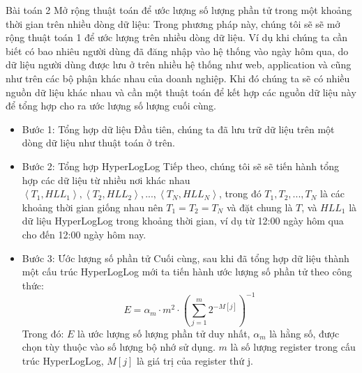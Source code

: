 \documentclass[10pt]{beamer}
\begin{document}
\begin{frame}[fragile]{Bài toán 2}
  Mở rộng thuật toán để ước lượng số lượng phần tử trong một khoảng thời gian trên nhiều dòng dữ liệu:
  Trong phương pháp này, chúng tôi sẽ sẽ mở rộng thuật toán 1 để ước lượng trên nhiều dòng dữ liệu. Ví dụ khi chúng ta cần biết có bao nhiêu người dùng
  đã đăng nhập vào hệ thống vào ngày hôm qua, do dữ liệu người dùng được lưu ở trên nhiều hệ thống như web, application và cũng như trên các bộ phận khác nhau
  của doanh nghiệp. Khi đó chúng ta sẽ có nhiều nguồn dữ liệu khác nhau và cần một thuật toán để kết hợp các nguồn dữ liệu này để tổng hợp cho ra ước lượng
  số lượng cuối cùng.
  \begin{itemize}
      \item Bước 1: Tổng hợp dữ liệu
      Đầu tiên, chúng ta đã lưu trữ dữ liệu trên một dòng dữ liệu như thuật toán ở trên. 
      \item Bước 2: Tổng hợp HyperLogLog
      Tiếp theo, chúng tôi sẽ sẽ tiến hành tổng hợp các dữ liệu từ nhiều nơi khác nhau $\left< T_1, HLL_1\right>, \left< T_2, HLL_2\right>,...,\left< T_N, HLL_N\right>$, 
      trong đó $T_1, T_2,...,T_N$ là các khoảng thời gian giống nhau nên $T_1 = T_2 = T_N$ và đặt chung là $T$, và $HLL_1$ là dữ liệu HyperLogLog trong khoảng thời gian, ví dụ
      từ 12:00 ngày hôm qua cho đến 12:00 ngày hôm nay.  
      \item Bước 3: Ước lượng số phần tử
      Cuối cùng, sau khi đã tổng hợp dữ liệu thành một cấu trúc HyperLogLog mới ta tiến hành ước lượng số phần tử theo công thức:
      \[E = \alpha_m \cdot m^2 \cdot \left( \sum_{j=1}^{m} 2^{-M[j]} \right)^{-1}\]
      Trong đó: $E$ là ước lượng số lượng phần tử duy nhất, 
      $\alpha_m$ là hằng số, được chọn tùy thuộc vào số lượng bộ nhớ sử dụng.
      $m$ là số lượng register trong cấu trúc HyperLogLog, $M[j]$ là giá trị của register thứ j.
  
  \end{itemize}
\end{frame}
\end{document}
